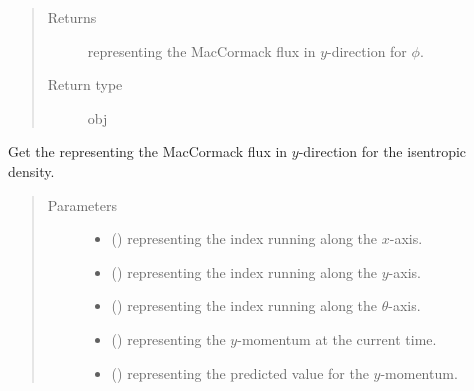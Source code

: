 \documentclass[letterpaper,10pt,english]{sphinxmanual}
\begin{document}
\begin{fulllineitems}
\begin{fulllineitems}
\begin{quote}
\begin{description}
\begin{itemize}
\end{itemize}

\item[{Returns}] \leavevmode
{} representing the MacCormack flux in \(y\)-direction for \(\phi\).

\item[{Return type}] \leavevmode
obj

\end{description}\end{quote}

\end{fulllineitems}


\begin{fulllineitems}
\label{\detokenize{api:dycore.flux_isentropic.FluxIsentropicMacCormack._get_maccormack_flux_y_density}}
Get the  representing the MacCormack flux in \(y\)-direction for the
isentropic density.
\begin{quote}\begin{description}
\item[{Parameters}] \leavevmode\begin{itemize}
\item {} 
 () \textendash{}  representing the index running along the \(x\)-axis.

\item {} 
 () \textendash{}  representing the index running along the \(y\)-axis.

\item {} 
 () \textendash{}  representing the index running along the \(\theta\)-axis.

\item {} 
 () \textendash{}  representing the \(y\)-momentum at the current time.

\item {} 
 () \textendash{}  representing the predicted value for the \(y\)-momentum.


\end{itemize}
\end{description}
\end{quote}
\end{fulllineitems}
\end{fulllineitems}
\end{document}
